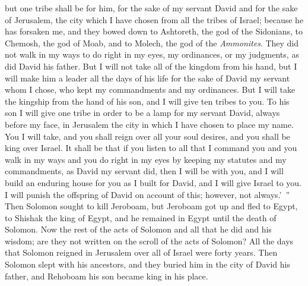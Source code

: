 \begin{biblechapter}
\verse but one tribe shall be for him, for the sake of my servant David and for the sake of Jerusalem, the city which I have chosen from all the tribes of Israel;
\verse because he has forsaken me, and they bowed down to Ashtoreth, the god of the Sidonians, to Chemosh, the god of Moab, and to Molech, the god of the \textit{Ammonites}. They did not walk in my ways to do right in my eyes, my ordinances, or my judgments, as did David his father.
\verse But I will not take all of the kingdom from his hand, but I will make him a leader all the days of his life for the sake of David my servant whom I chose, who kept my commandments and my ordinances.
\verse But I will take the kingship from the hand of his son, and I will give ten tribes to you.
\verse To his son I will give one tribe in order to be a lamp for my servant David, always before my face, in Jerusalem the city in which I have chosen to place my name.
\verse You I will take, and you shall reign over all your soul desires, and you shall be king over Israel.
\verse It shall be that if you listen to all that I command you and you walk in my ways and you do right in my eyes by keeping my statutes and my commandments, as David my servant did, then I will be with you, and I will build an enduring house for you as I built for David, and I will give Israel to you.
\verse I will punish the offspring of David on account of this; however, not always.’ ”
\verse Then Solomon sought to kill Jeroboam, but Jeroboam got up and fled to Egypt, to Shishak the king of Egypt, and he remained in Egypt until the death of Solomon.
\verse Now the rest of the acts of Solomon and all that he did and his wisdom; are they not written on the scroll of the acts of Solomon?
\verse All the days that Solomon reigned in Jerusalem over all of Israel were forty years.
\verse Then Solomon slept with his ancestors, and they buried him in the city of David his father, and Rehoboam his son became king in his place.
\end{biblechapter}

